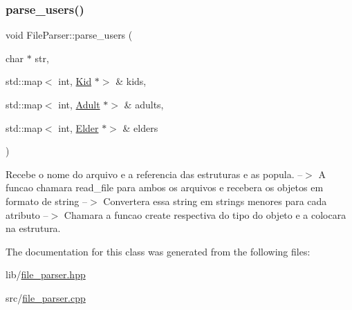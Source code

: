\mbox{\label{class_file_parser_a9a6629f07f5752cfd488b47dc7ac1690}} 
\subsubsection{\texorpdfstring{parse\+\_\+users()}{parse\_users()}}
{\footnotesize\ttfamily void File\+Parser\+::parse\+\_\+users (\begin{DoxyParamCaption}\item[{char $\ast$}]{str,  }\item[{std\+::map$<$ int, \hyperlink{class_kid}{Kid} $\ast$$>$ \&}]{kids,  }\item[{std\+::map$<$ int, \hyperlink{class_adult}{Adult} $\ast$$>$ \&}]{adults,  }\item[{std\+::map$<$ int, \hyperlink{class_elder}{Elder} $\ast$$>$ \&}]{elders }\end{DoxyParamCaption})\hspace{0.3cm}{\ttfamily [static]}}



Recebe o nome do arquivo e a referencia das estruturas e as popula. --$>$ A funcao chamara read\+\_\+file para ambos os arquivos e recebera os objetos em formato de string --$>$ Convertera essa string em strings menores para cada atributo --$>$ Chamara a funcao create respectiva do tipo do objeto e a colocara na estrutura. 



The documentation for this class was generated from the following files\+:\begin{DoxyCompactItemize}
\item 
lib/\hyperlink{file__parser_8hpp}{file\+\_\+parser.\+hpp}\item 
src/\hyperlink{file__parser_8cpp}{file\+\_\+parser.\+cpp}\end{DoxyCompactItemize}
